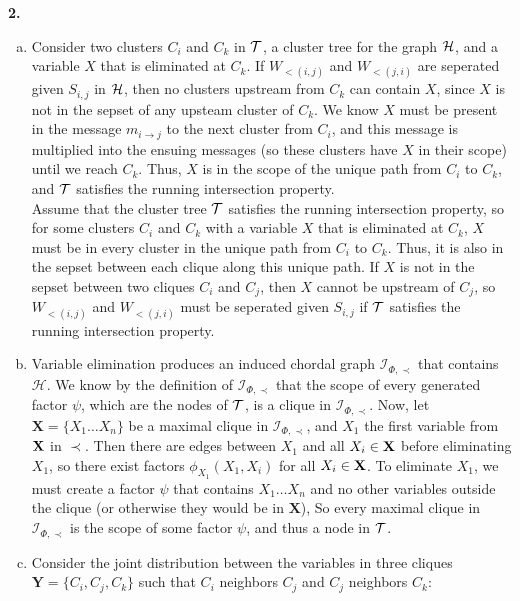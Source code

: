 \documentclass{article}
\begin{document}
\textbf{2.}
\begin{enumerate}[(a)]
    \item Consider two clusters $C_i$ and $C_k$ in $\cal{T}$, a cluster tree for the graph $\cal{H}$, and a variable $X$ that is eliminated at $C_k$. If $W_{<(i, j)}$ and $W_{<(j, i)}$ are seperated given $S_{i,j}$ in $\cal{H}$, then no clusters upstream from $C_k$ can contain $X$, since $X$ is not in the sepset of any upsteam cluster of $C_k$. We know $X$ must be present in the message $m_{i \rightarrow j}$ to the next cluster from $C_i$, and this message is multiplied into the ensuing messages (so these clusters have $X$ in their scope) until we reach $C_k$. Thus, $X$ is in the scope of the unique path from $C_i$ to $C_k$, and $\cal{T}$ satisfies the running intersection property. \\[0.75ex]
    Assume that the cluster tree $\cal{T}$ satisfies the running intersection property, so for some clusters $C_i$ and $C_k$ with a variable $X$ that is eliminated at $C_k$, $X$ must be in every cluster in the unique path from $C_i$ to $C_k$. Thus, it is also in the sepset between each clique along this unique path. If $X$ is not in the sepset between two cliques $C_i$ and $C_j$, then $X$ cannot be upstream of $C_j$, so $W_{<(i, j)}$ and $W_{<(j, i)}$ must be seperated given $S_{i,j}$ if $\cal{T}$ satisfies the running intersection property. 
    \item Variable elimination produces an induced chordal graph $\mathcal{I}_{\Phi, \prec}$ that contains $\mathcal{H}$. We know by the definition of $\mathcal{I}_{\Phi, \prec}$ that the scope of every generated factor $\psi$, which are the nodes of $\cal{T}$, is a clique in $\mathcal{I}_{\Phi, \prec}$. Now, let $\mathbf{X} = \{X_1 \dots X_n\}$ be a maximal clique in $\mathcal{I}_{\Phi, \prec}$, and $X_1$ the first variable from $\bf{X}$ in $\prec$. Then there are edges between $X_1$ and all $X_i \in \bf{X}$ before eliminating $X_1$, so there exist factors $\phi_{X_1}(X_1, X_i)$ for all $X_i \in \bf{X}$. To eliminate $X_1$, we must create a factor $\psi$ that contains $X_1 \dots X_n$ and no other variables outside the clique (or otherwise they would be in $\mathbf{X}$), So every maximal clique in $\mathcal{I}_{\Phi, \prec}$ is the scope of some factor $\psi$, and thus a node in $\cal{T}$.
    \item 
    Consider the joint distribution between the variables in three cliques $\mathbf{Y} = \{C_i, C_j, C_k\}$ such that $C_i$ neighbors $C_j$ and $C_j$ neighbors $C_k$: \begin{align*}

\end{align*}
\end{enumerate}
\end{document}
